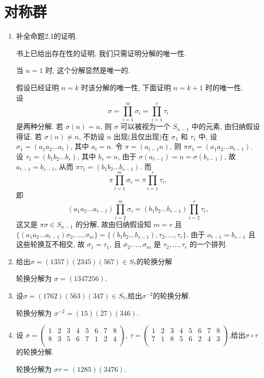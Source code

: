\section{对称群}
\begin{enumerate}
\item 补全命题2.1的证明.
\begin{solution}
    书上已给出存在性的证明, 我们只需证明分解的唯一性.

    当 $n=1$ 时, 这个分解显然是唯一的.

    假设已经证明 $n=k$ 时该分解的唯一性, 下面证明 $n=k+1$ 时的唯一性. \\
    设
    $$\sigma=\prod_{i=1}^m\sigma_i=\prod_{i=1}^r\tau_i$$
    是两种分解.
    若 $\sigma(n)=n$, 则 $\sigma$ 可以被视为一个 $S_{n-1}$ 中的元素, 由归纳假设得证.
    若 $\sigma(n)\not=n$,
    不妨设 $n$ 出现(且仅出现)在 $\sigma_1$ 和 $\tau_1$ 中,
    设 $\sigma_1=(a_1a_2\dots a_t)$, 其中 $a_t=n$.
    令 $\pi=(a_{t-1}n)$,
    则 $\pi\sigma_1=(a_1a_2\dots a_{t-1})$.
    设 $\tau_1=(b_1b_2\dots b_s)$, 其中 $b_s=n$,
    由于 $\sigma(a_{t-1})=n=\sigma(b_{s-1})$,
    故 $a_{t-1}=b_{s-1}$,
    从而 $\pi\tau_1=(b_1b_2\dots b_{s-1})$.
    而
    $$\pi\prod_{i=1}^m\sigma_i=\pi\prod\limits_{i=1}^r\tau_i,$$
    即
    $$(a_1a_2\dots a_{t-1})\prod_{i=2}^m\sigma_i=(b_1b_2\dots b_{s-1})\prod\limits_{i=2}^r\tau_i,$$
    这又是 $\pi\sigma\in S_{n-1}$ 的分解,
    故由归纳假设知 $m=r$ 且 $\{(a_1a_2\dots a_{t-1})\sigma_2,\dots,\sigma_m\}=\{(b_1b_2\dots b_{s-1}),\tau_2,\dots,\tau_r\}$.
    由于 $a_{t-1}=b_{s-1}$ 且这些轮换互不相交,
    故 $\sigma_1=\tau_1$, 且 $\sigma_2,\dots,\sigma_m$ 是 $\tau_2,\dots,\tau_r$ 的一个排列. 
\end{solution}

\item 给出$\sigma = (1357)(2345)(567) \in S_{7}$的轮换分解
\begin{solution}
    轮换分解为 $\sigma=(1347256)$. 
\end{solution}

\item 设$\sigma = (1762)(563)(347) \in S_{7}$,给出$\sigma^{-2}$的轮换分解.
\begin{solution}
    轮换分解为 $\sigma^{-2}=(15)(27)(346)$. 
\end{solution}

\item 设
$\sigma = \begin{pmatrix}
  1 & 2 & 3 & 4 & 5 & 6 & 7 & 8 \\
  8 & 3 & 5 & 6 & 7 & 1 & 2 & 4 \\
\end{pmatrix}$,
$\tau = \begin{pmatrix}
  1 & 2 & 3 & 4 & 5 & 6 & 7 & 8 \\
  7 & 1 & 8 & 5 & 6 & 2 & 4 & 3 \\
\end{pmatrix}$,给出$\sigma \circ \tau$的轮换分解.
\begin{solution}
    轮换分解为 $\sigma\tau=(1285)(3476)$. 
\end{solution}


\end{enumerate}
